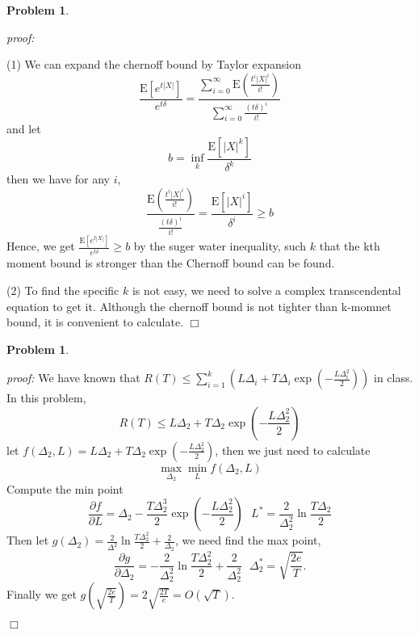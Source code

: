 \documentclass{article}
\newtheorem{problem}[theorem]{Problem}
\newenvironment{solution}{\noindent \textit{proof:}}{$\Box$}
\begin{document}
\begin{problem}
\end{problem}
\begin{solution}

(1) We can expand the chernoff bound by Taylor expansion
$$
\frac {\mathrm{E}[e^{t|X|}]} {e^{t\delta}} = \frac {\sum_{i=0}^\infty \mathrm{E}\left(\frac {t^i|X|^i} {i!}\right)} {\sum_{i=0}^\infty \frac {(t\delta)^i} {i!}}
$$
and let 
$$
    b = \inf_k \frac {\mathrm{E}[|X|^k]} {\delta^k}
$$
then we have for any $i$,
$$
\frac {\mathrm{E}\left(\frac {t^i|X|^i} {i!}\right)} {\frac {(t\delta)^i}{i!}} =  
\frac {\mathrm{E}[|X|^i]} {\delta^i} \geq b
$$
Hence, we get $\frac {\mathrm{E}[e^{t|X|}]} {e^{t\delta}} \geq b$ by the suger water inequality, such $k$ that the kth moment bound is stronger than the Chernoff bound can be found.

(2) To find the specific $k$ is not easy, we need to solve a complex transcendental equation to get it. Although the chernoff bound is not tighter than 
k-momnet bound, it is convenient to calculate.
\end{solution}

\begin{problem}
\end{problem}
\begin{solution}
    We have known that $R(T) \leq \sum_{i=1}^k (L\Delta_i+T\Delta_i\exp(-\frac {L\Delta_i^2} {2}))$ in class. In this problem, 
    $$
    R(T) \leq L\Delta_2+T\Delta_2\exp\left(-\frac {L\Delta_2^2} {2}\right)
    $$
    let $f(\Delta_2, L) = L\Delta_2+T\Delta_2\exp\left(-\frac {L\Delta_2^2} {2}\right)$, then we just need to calculate 
    $$
    \max_{\Delta_2}\min_{L} f(\Delta_2,L)
    $$
    Compute the min point 
    $$
    \frac {\partial f} {\partial L} = \Delta_2 - 
    \frac {T\Delta_2^3} {2} \exp\left(-\frac {L\Delta_2^2} {2}\right) 
    ~~~ L^* = \frac {2} {\Delta_2^2}\ln \frac {T\Delta_2} {2}
    $$
    Then let $g(\Delta_2) = \frac {2} {\Delta^2}\ln \frac {T\Delta_2^2} {2} + \frac {2} {\Delta_2}$, we need find the max point,
    $$
    \frac {\partial g} {\partial \Delta_2} = -\frac {2}{\Delta_2^2}\ln \frac {T\Delta_2^2} {2} + \frac {2} {\Delta_2^2} ~~~ 
    \Delta_2^*  = \sqrt{\frac {2e} {T}}. 
    $$
    Finally we get $g(\sqrt{\frac {2e} {T}}) = 2\sqrt{\frac {2T}{e}} = O(\sqrt{T})$.
    
\end{solution}
\end{document}
